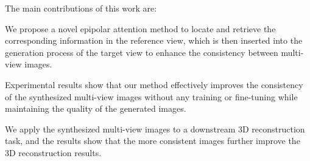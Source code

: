 The main contributions of this work are:
\begin{compactitem}
    \item  We propose a novel epipolar attention method to locate and retrieve the corresponding information in the reference view, which is then inserted into the generation process of the target view to enhance the consistency between multi-view images.
    \item Experimental results show that our method effectively improves the consistency of the synthesized multi-view images without any training or fine-tuning while maintaining the quality of the generated images.
    \item We apply the synthesized multi-view images to a downstream 3D reconstruction task, and the results show that the more consistent images further improve the 3D reconstruction results.
\end{compactitem} 
